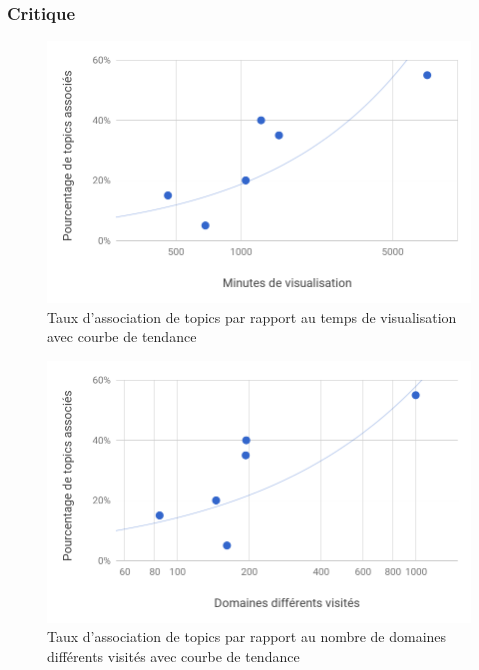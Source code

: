 \FloatBarrier

		\subsubsection{Critique}

			\begin{figure}[!h]
				\centering
				\includegraphics[height=0.6\textwidth]{images/results/chart-1}
				\caption{Taux d'association de topics par rapport au temps de visualisation avec courbe de tendance}
				\label{chart-1}
			\end{figure}

			\begin{figure}[!h]
				\centering
				\includegraphics[height=0.6\textwidth]{images/results/chart-2}
				\caption{Taux d'association de topics par rapport au nombre de domaines différents visités avec courbe de tendance}
				\label{chart-2}
			\end{figure}

